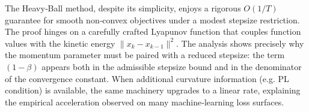 \documentclass{article}
\begin{document}
The Heavy‑Ball method, despite its simplicity, enjoys a rigorous $O(1/T)$ guarantee for smooth non‑convex objectives under a modest stepsize restriction.  The proof hinges on a carefully crafted Lyapunov function that couples function values with the kinetic energy $\|x_{k}-x_{k-1}\|^{2}$.  The analysis shows precisely why the momentum parameter must be paired with a reduced stepsize: the term $(1-\beta)$ appears both in the admissible stepsize bound and in the denominator of the convergence constant.  When additional curvature information (e.g. PL condition) is available, the same machinery upgrades to a linear rate, explaining the empirical acceleration observed on many machine‑learning loss surfaces.
\end{document}
